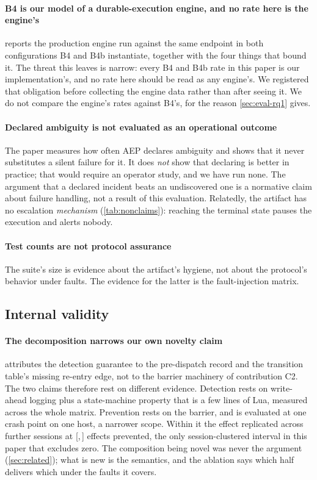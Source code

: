 \paragraph{B4 is our model of a durable-execution engine, and no rate here is
the engine's}  reports the production engine run against the
same endpoint in both configurations B4 and B4b instantiate, together with the
four things that bound it. The threat this leaves is narrow: every B4 and B4b
rate in this paper is our implementation's, and no rate here should be read as
any engine's. We registered that obligation before collecting the engine data
rather than after seeing it. We do not compare the engine's rates against B4's,
for the reason \cref{sec:eval-rq1} gives.

\paragraph{Declared ambiguity is not evaluated as an operational outcome} The
paper measures how often AEP declares ambiguity and shows that it never
substitutes a silent failure for it. It does \emph{not} show that declaring is
better in practice; that would require an operator study, and we have run none.
The argument that a declared incident beats an undiscovered one is a normative
claim about failure handling, not a result of this evaluation. Relatedly, the
artifact has no escalation \emph{mechanism} (\cref{tab:nonclaims}): reaching the
terminal state pauses the execution and alerts nobody.

\paragraph{Test counts are not protocol assurance} The suite's size is evidence
about the artifact's hygiene, not about the protocol's behavior under faults.
The evidence for the latter is the fault-injection matrix.

\subsection{Internal validity}

\paragraph{The decomposition narrows our own novelty claim}
 attributes the detection guarantee to the pre-dispatch
record and the transition table's missing re-entry edge, not to the barrier
machinery of contribution C2. The two claims therefore rest on different
evidence. Detection rests on write-ahead logging plus a state-machine property
that is a few lines of Lua, measured across the whole matrix. Prevention rests
on the barrier, and is evaluated at one crash point on one host, a narrower
scope. Within it the effect replicated across \ReplicationSessions{}
further sessions at
[\ReplicationPreventedLow{},\,\ReplicationPreventedHigh{}] effects prevented,
the only session-clustered interval in this paper that excludes zero. The
composition being novel was never the argument (\cref{sec:related}); what is new
is the semantics, and the ablation says which half delivers which under the
faults it covers.

